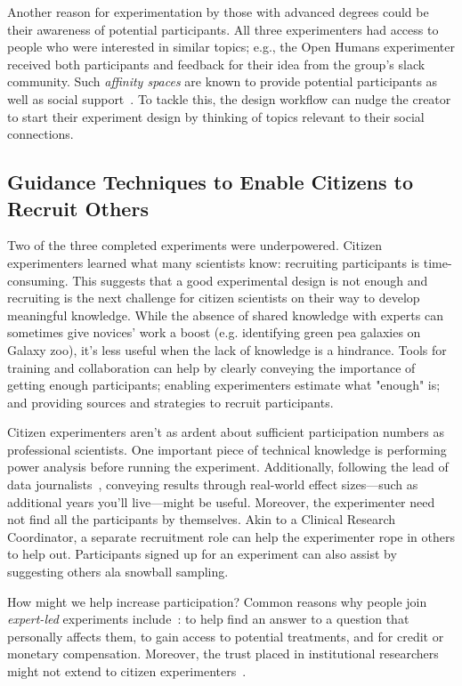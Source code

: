 Another reason for experimentation by those with advanced degrees could be their awareness of potential participants. All three experimenters had access to people who were interested in similar topics; e.g., the Open Humans experimenter received both participants and feedback for their idea from the group's slack community. Such \textit{affinity spaces} are known to provide potential participants as well as social support~\cite{gee2005semiotic}. To tackle this, the design workflow can nudge the creator to start their experiment design by thinking of topics relevant to their social connections.

\subsection{Guidance Techniques to Enable Citizens to Recruit Others}
Two of the three completed experiments were underpowered. Citizen experimenters learned what many scientists know: recruiting participants is time-consuming. This suggests that a good experimental design is not enough and recruiting is the next challenge for citizen scientists on their way to develop meaningful knowledge. While the absence of shared knowledge with experts can sometimes give novices' work a boost (e.g. identifying green pea galaxies on Galaxy zoo), it's less useful when the lack of knowledge is a hindrance. Tools for training and collaboration can help by clearly conveying the importance of getting enough participants; enabling experimenters estimate what "enough" is; and providing sources and strategies to recruit participants.

Citizen experimenters aren't as ardent about sufficient participation numbers as professional scientists. One important piece of technical knowledge is performing power analysis before running the experiment. Additionally, following the lead of data journalists~\cite{Gray2012}, conveying results through real-world effect sizes---such as additional years you'll live---might be useful. Moreover, the experimenter need not find all the participants by themselves. Akin to a Clinical Research Coordinator, a separate recruitment role can help the experimenter rope in others to help out. Participants signed up for an experiment can also assist by suggesting others ala snowball sampling.

How might we help increase participation? Common reasons why people join \textit{expert-led} experiments include~\cite{NIH2015}: to help find an answer to a question that personally affects them, to gain access to potential treatments, and for credit or monetary compensation. Moreover, the trust placed in institutional researchers might not extend to citizen experimenters~\cite{Cooper2014}. 

